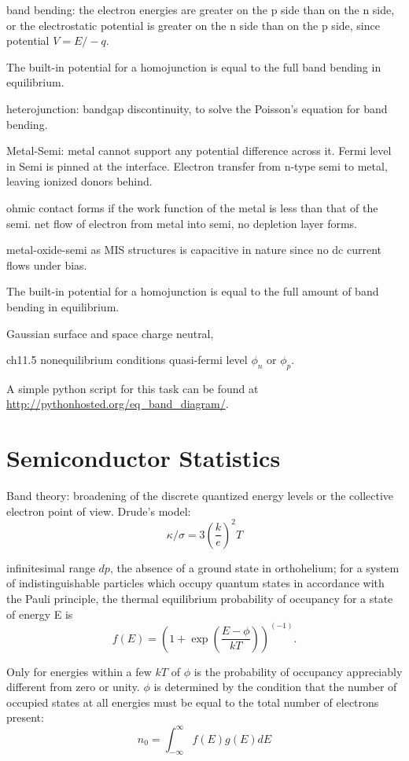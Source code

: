 band bending: the electron energies are greater on the p side than on the n side, or the electrostatic potential is greater on the n side than on the p side, since potential $V = E/-q$.

The built-in potential for a homojunction is equal to the full band bending in equilibrium.

heterojunction: bandgap discontinuity, to solve the Poisson's equation for band bending.

Metal-Semi: metal cannot support any potential difference across it. Fermi level in Semi is pinned at the interface. Electron transfer from n-type semi to metal, leaving ionized donors behind.

ohmic contact forms if the work function of the metal is less than that of the semi. net flow of electron from metal into semi, no depletion layer forms.

metal-oxide-semi as MIS structures is capacitive in nature since no dc current flows under bias.

The built-in potential for a homojunction is equal to the full amount of band bending in equilibrium. 

Gaussian surface and space charge neutral, 

ch11.5 nonequilibrium conditions
quasi-fermi level $\phi_n$ or $\phi_p$.

A simple python script for this task can be found at \url{http://pythonhosted.org/eq_band_diagram/}. 


\section{Semiconductor Statistics}

Band theory: broadening of the discrete quantized energy levels or the collective electron point of view. 
Drude's model:
\[
\kappa/\sigma = 3 (\frac{k}{e})^2T
\]

infinitesimal range $dp$, the absence of a ground state in orthohelium; for a system of indistinguishable particles which occupy quantum states in accordance with the Pauli principle, the thermal equilibrium probability of occupancy for a state of energy E is 
\[
f(E) = (1+\exp(\frac{E-\phi}{kT}))^(-1).
\]

Only for energies within a few $kT$ of $\phi$ is the probability of occupancy appreciably different from zero or unity. $\phi$ is determined by the condition that the number of occupied states at all energies must be equal to the total number of electrons present:
\[
n_0 = \int_{-\infty}^{\infty} f(E)g(E)dE
\]

